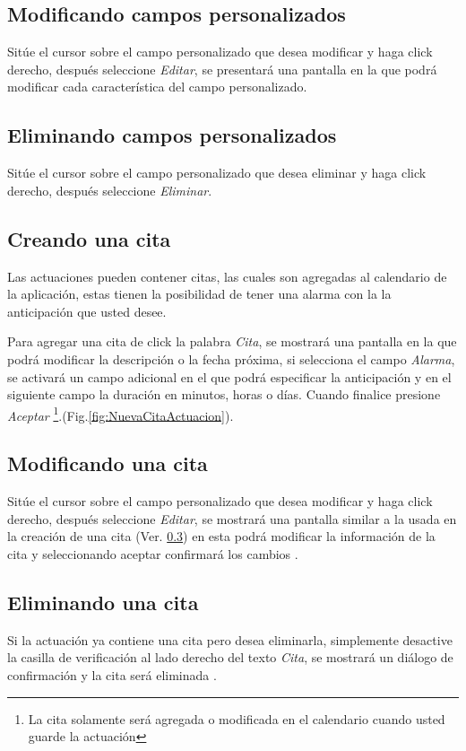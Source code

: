 \subsection{Modificando campos personalizados}
\label{sec:modificarCamposActuacion}
Sit\'ue el cursor sobre el campo personalizado que desea modificar y haga click derecho, despu\'es seleccione \emph{Editar},
se presentar\'a una pantalla en la que podr\'a modificar cada caracter\'istica
del campo personalizado.

\subsection{Eliminando campos personalizados}
\label{sec:eliminarCamposActuacion}
Sit\'ue el cursor sobre el campo personalizado que desea eliminar y haga click derecho, despu\'es seleccione \emph{Eliminar}.

\subsection{Creando una cita}
\label{sec:crearCita}
Las actuaciones pueden contener citas, las cuales son agregadas al calendario de la aplicaci\'on, estas tienen la posibilidad de tener una alarma
con la la anticipaci\'on que usted desee.

Para agregar una cita de click la palabra \emph{Cita}, se mostrar\'a una
pantalla en la que podr\'a modificar la descripci\'on o la fecha pr\'oxima,
si selecciona el campo \emph{Alarma}, se activar\'a un campo adicional en el
que podr\'a especificar la anticipaci\'on y en el siguiente campo la duraci\'on
en minutos, horas o d\'ias. Cuando finalice presione \emph{Aceptar}
\footnote{La cita solamente ser\'a agregada o modificada en el calendario cuando
usted guarde la actuaci\'on}.(Fig.\ref{fig:NuevaCitaActuacion}). 
  

\subsection{Modificando una cita}
\label{sec:modificarCita}
Sit\'ue el cursor sobre el campo personalizado que desea modificar y haga click derecho, despu\'es seleccione \emph{Editar}, se
mostrar\'a una pantalla similar a la usada en la creaci\'on de una cita (Ver.
\ref{sec:crearCita}) en esta podr\'a modificar la informaci\'on de la cita
y seleccionando aceptar confirmar\'a los cambios
\footnotemark[\value{footnote}].

\subsection{Eliminando una cita}
\label{sec:eliminarCita}
Si la actuaci\'on ya contiene una cita pero desea eliminarla, simplemente desactive la casilla de verificaci\'on al lado derecho del texto \emph{Cita}, se mostrar\'a
un di\'alogo de confirmaci\'on y la cita ser\'a eliminada
\footnotemark[\value{footnote}].